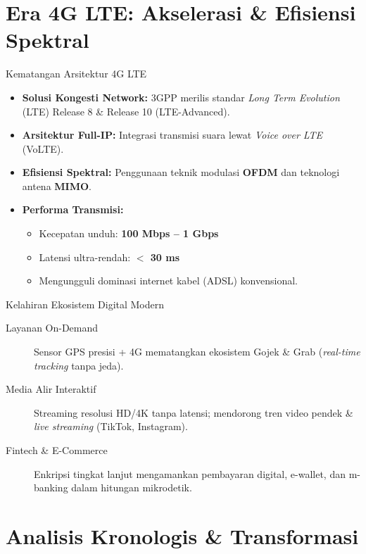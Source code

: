 \documentclass[10pt,aspectratio=169]{beamer}
\begin{document}
\section{Era 4G LTE: Akselerasi \& Efisiensi Spektral}

\begin{frame}{Kematangan Arsitektur 4G LTE}
  \begin{itemize}
    \item \textbf{Solusi Kongesti Network:} 3GPP merilis standar \textit{Long Term Evolution} (LTE) Release 8 \& Release 10 (LTE-Advanced).
    \item \textbf{Arsitektur Full-IP:} Integrasi transmisi suara lewat \textit{Voice over LTE} (VoLTE).
    \item \textbf{Efisiensi Spektral:} Penggunaan teknik modulasi \textbf{OFDM} dan teknologi antena \textbf{MIMO}.
    \item \textbf{Performa Transmisi:}
      \begin{itemize}
        \item Kecepatan unduh: \textbf{100 Mbps -- 1 Gbps}
        \item Latensi ultra-rendah: \textbf{$<$ 30 ms}
        \item Mengungguli dominasi internet kabel (ADSL) konvensional.
      \end{itemize}
  \end{itemize}
\end{frame}

\begin{frame}{Kelahiran Ekosistem Digital Modern}
  \begin{description}
    \item[Layanan On-Demand] Sensor GPS presisi + 4G mematangkan ekosistem Gojek \& Grab (\textit{real-time tracking} tanpa jeda).
    \item[Media Alir Interaktif] Streaming resolusi HD/4K tanpa latensi; mendorong tren video pendek \& \textit{live streaming} (TikTok, Instagram).
    \item[Fintech \& E-Commerce] Enkripsi tingkat lanjut mengamankan pembayaran digital, e-wallet, dan m-banking dalam hitungan mikrodetik.
  \end{description}
\end{frame}

\section{Analisis Kronologis \& Transformasi}
\end{document}
